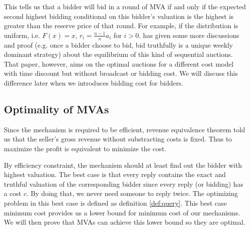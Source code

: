 This tells us that a bidder will bid in a round of MVA if and only if the
expected second highest bidding conditional on this bidder's valuation is the
highest is greater than the reserve price of that round. For example, if the
distribution is uniform, i.e. $F(x) = x$, $r_i = \frac{n-1}{n} a_i$ for $i >
0$. \cite{McAfee97:SequentialAuctions} has given some more discussions and
proof (e.g. once a bidder choose to bid, bid truthfully is a unique weekly
dominant strategy) about the equilibrium of this kind of sequential auctions.
That paper, however, aims on the optimal auctions for a different cost model
with time discount but without broadcast or bidding cost. We will discuss this
difference later when we introduces bidding cost for bidders.

\subsection{Optimality of MVAs}

Since the mechanism is required to be efficient, revenue equivalence theorem
\cite{Myerson:1981} told us that the seller's gross revenue without substracting costs is
fixed. Thus to maximize the profit is equivalent to minimize the cost. 

By efficiency constraint, the mechanism should at least find out the bidder
with highest valuation.  The best case is that every reply contains the exact
and truthful valuation of the corresponding bidder since every reply (or
bidding) has a cost $c$. By doing that, we never need someone to reply twice.
The optimizing problem in this best case is defined as definition
\ref{def:query}.  This best case minimum cost provides us a lower bound for
minimum cost of our mechanisms. We will then prove that MVAs can achieve this
lower bound so they are optimal.

